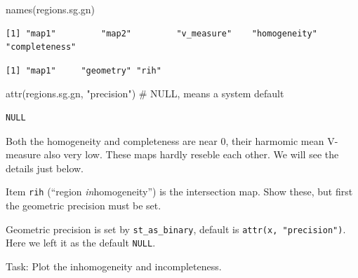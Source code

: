 \documentclass[
  letterpaper,
  DIV=11,
  numbers=noendperiod]{scrartcl}
\newenvironment{Shaded}{\begin{snugshade}}{\end{snugshade}}
\newcommand{\AttributeTok}[1]{\textcolor[rgb]{0.40,0.45,0.13}{#1}}
\newcommand{\CommentTok}[1]{\textcolor[rgb]{0.37,0.37,0.37}{#1}}
\newcommand{\FunctionTok}[1]{\textcolor[rgb]{0.28,0.35,0.67}{#1}}
\newcommand{\NormalTok}[1]{\textcolor[rgb]{0.00,0.23,0.31}{#1}}
\newcommand{\SpecialCharTok}[1]{\textcolor[rgb]{0.37,0.37,0.37}{#1}}
\newcommand{\StringTok}[1]{\textcolor[rgb]{0.13,0.47,0.30}{#1}}
\begin{document}
\begin{Shaded}
\begin{Highlighting}[]
\FunctionTok{names}\NormalTok{(regions.sg.gn)}
\end{Highlighting}
\end{Shaded}

\begin{verbatim}
[1] "map1"         "map2"         "v_measure"    "homogeneity"  "completeness"
\end{verbatim}

\begin{Shaded}
\end{Shaded}

\begin{verbatim}
[1] "map1"     "geometry" "rih"     
\end{verbatim}

\begin{Shaded}
\begin{Highlighting}[]
\FunctionTok{attr}\NormalTok{(regions.sg.gn, }\StringTok{"precision"}\NormalTok{)  }\CommentTok{\# NULL, means a system default}
\end{Highlighting}
\end{Shaded}

\begin{verbatim}
NULL
\end{verbatim}

Both the homogeneity and completeness are near 0, their harmomic mean
V-measure also very low. These maps hardly reseble each other. We will
see the details just below.

Item \texttt{rih} (``region \emph{in}homogeneity'') is the intersection
map. Show these, but first the geometric precision must be set.

Geometric precision is set by \texttt{st\_as\_binary}, default is
\texttt{attr(x,\ "precision")}. Here we left it as the default
\texttt{NULL}.

Task: Plot the inhomogeneity and incompleteness.

\begin{Shaded}
\end{Shaded}
\end{document}
